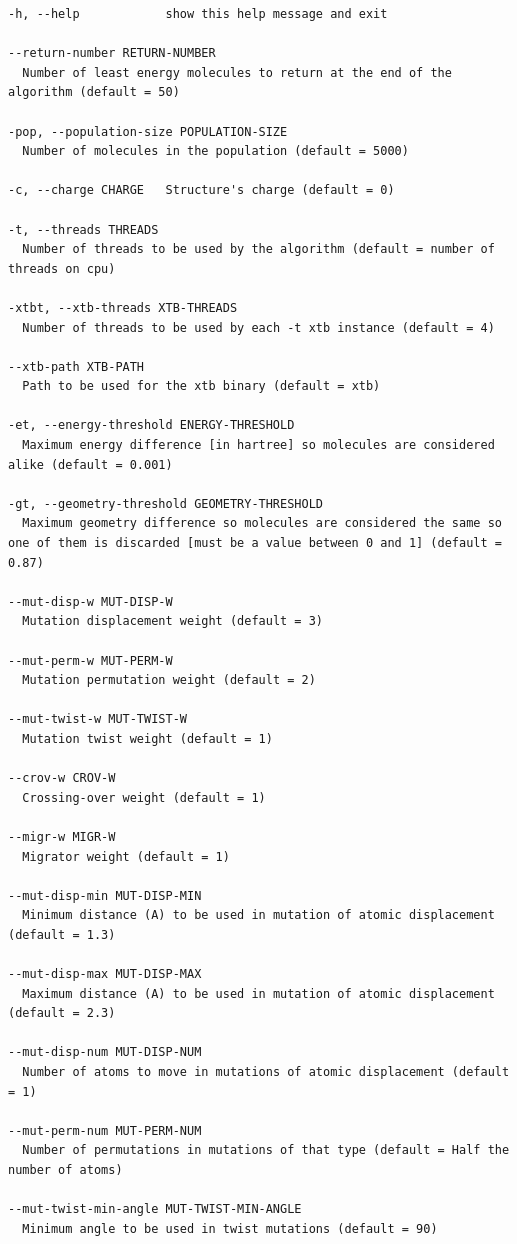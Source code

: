 \documentclass[
  article,
  12pt,
  oneside,
  english,
  brazil,
  sumario=abnt-6027-2012,
]{abntex2}
\begin{document}
\begin{lstlisting}
-h, --help            show this help message and exit

--return-number RETURN-NUMBER
  Number of least energy molecules to return at the end of the algorithm (default = 50)

-pop, --population-size POPULATION-SIZE
  Number of molecules in the population (default = 5000)

-c, --charge CHARGE   Structure's charge (default = 0)

-t, --threads THREADS
  Number of threads to be used by the algorithm (default = number of threads on cpu)

-xtbt, --xtb-threads XTB-THREADS
  Number of threads to be used by each -t xtb instance (default = 4)

--xtb-path XTB-PATH
  Path to be used for the xtb binary (default = xtb)

-et, --energy-threshold ENERGY-THRESHOLD
  Maximum energy difference [in hartree] so molecules are considered alike (default = 0.001)

-gt, --geometry-threshold GEOMETRY-THRESHOLD
  Maximum geometry difference so molecules are considered the same so one of them is discarded [must be a value between 0 and 1] (default = 0.87)

--mut-disp-w MUT-DISP-W
  Mutation displacement weight (default = 3)

--mut-perm-w MUT-PERM-W
  Mutation permutation weight (default = 2)

--mut-twist-w MUT-TWIST-W
  Mutation twist weight (default = 1)

--crov-w CROV-W
  Crossing-over weight (default = 1)

--migr-w MIGR-W
  Migrator weight (default = 1)

--mut-disp-min MUT-DISP-MIN
  Minimum distance (A) to be used in mutation of atomic displacement (default = 1.3)

--mut-disp-max MUT-DISP-MAX
  Maximum distance (A) to be used in mutation of atomic displacement (default = 2.3)

--mut-disp-num MUT-DISP-NUM
  Number of atoms to move in mutations of atomic displacement (default = 1)

--mut-perm-num MUT-PERM-NUM
  Number of permutations in mutations of that type (default = Half the number of atoms)

--mut-twist-min-angle MUT-TWIST-MIN-ANGLE
  Minimum angle to be used in twist mutations (default = 90)


\end{lstlisting}
\end{document}
